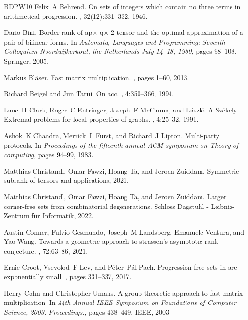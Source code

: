 \documentclass[10pt,a4paper]{article}
\begin{document}
\begin{thebibliography}{BDPW10}
Felix~A Behrend.
\newblock On sets of integers which contain no three terms in arithmetical
  progression.
,
  32(12):331--332, 1946.

Dario Bini.
\newblock Border rank of ap$\times$ q$\times$ 2 tensor and the optimal
  approximation of a pair of bilinear forms.
\newblock In {\em Automata, Languages and Programming: Seventh Colloquium
  Noordwijkerhout, the Netherlands July 14--18, 1980}, pages 98--108. Springer,
  2005.

Markus Bl{\"a}ser.
\newblock Fast matrix multiplication.
, pages 1--60, 2013.

Richard Beigel and Jun Tarui.
\newblock On acc.
, 4:350--366, 1994.

Lane~H Clark, Roger~C Entringer, Joseph~E McCanna, and L{\'a}szl{\'o}~A
  Sz{\'e}kely.
\newblock Extremal problems for local properties of graphs.
, 4:25--32, 1991.

Ashok~K Chandra, Merrick~L Furst, and Richard~J Lipton.
\newblock Multi-party protocols.
\newblock In {\em Proceedings of the fifteenth annual ACM symposium on Theory
  of computing}, pages 94--99, 1983.

Matthias Christandl, Omar Fawzi, Hoang Ta, and Jeroen Zuiddam.
\newblock Symmetric subrank of tensors and applications, 2021.

Matthias Christandl, Omar Fawzi, Hoang Ta, and Jeroen Zuiddam.
\newblock Larger corner-free sets from combinatorial degenerations.
\newblock Schloss Dagstuhl - Leibniz-Zentrum für Informatik, 2022.

Austin Conner, Fulvio Gesmundo, Joseph~M Landsberg, Emanuele Ventura, and Yao
  Wang.
\newblock Towards a geometric approach to strassen’s asymptotic rank
  conjecture.
, 72:63--86, 2021.

Ernie Croot, Vsevolod~F Lev, and P{\'e}ter~P{\'a}l Pach.
\newblock Progression-free sets in are exponentially small.
, pages 331--337, 2017.

Henry Cohn and Christopher Umans.
\newblock A group-theoretic approach to fast matrix multiplication.
\newblock In {\em 44th Annual IEEE Symposium on Foundations of Computer
  Science, 2003. Proceedings.}, pages 438--449. IEEE, 2003.


\end{thebibliography}
\end{document}
